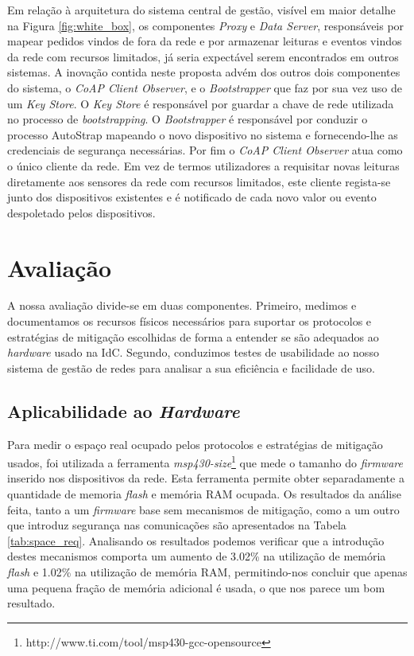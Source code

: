\documentclass{llncs}
\begin{document}
Em relação à arquitetura do sistema central de gestão, visível em maior detalhe na Figura \ref{fig:white_box}, os componentes \textit{Proxy} e \textit{Data Server}, responsáveis por mapear pedidos vindos de fora da rede e por armazenar leituras e eventos vindos da rede com recursos limitados, já seria expectável serem encontrados em outros sistemas. 
A inovação contida neste proposta advém dos outros dois componentes do sistema, o \textit{CoAP Client Observer}, e o \textit{Bootstrapper} que faz por sua vez uso de um \textit{Key Store}. 
O \textit{Key Store} é responsável por guardar a chave de rede utilizada no processo de \textit{bootstrapping}. 
O \textit{Bootstrapper} é responsável por conduzir o processo AutoStrap mapeando o novo dispositivo no sistema e fornecendo-lhe as credenciais de segurança necessárias. Por fim o \textit{CoAP Client Observer} atua como o único cliente da rede. Em vez de termos utilizadores a requisitar novas leituras diretamente aos sensores da rede com recursos limitados, este cliente regista-se junto dos dispositivos existentes e é notificado de cada novo valor ou evento despoletado pelos dispositivos. 

\section{Avaliação}
\label{sec:evaluation}
A nossa avaliação divide-se em duas componentes. Primeiro, medimos e documentamos os recursos físicos necessários para suportar os protocolos e estratégias de mitigação escolhidas de forma a entender se são adequados ao \textit{hardware} usado na \ac{IdC}. Segundo, conduzimos testes de usabilidade ao nosso sistema de gestão de redes para analisar a sua eficiência e facilidade de uso.

\subsection{Aplicabilidade ao \textit{Hardware}}
Para medir
o espaço real ocupado pelos protocolos e estratégias de mitigação usados, foi utilizada a ferramenta \textit{msp430-size}\footnote{http://www.ti.com/tool/msp430-gcc-opensource} que mede o tamanho do \textit{firmware} inserido nos dispositivos da rede. 
Esta ferramenta permite obter separadamente a quantidade de memoria \emph{flash} e memória \ac{RAM} ocupada. Os resultados da análise feita, tanto a um \textit{firmware} base sem mecanismos de mitigação, como a um outro que introduz segurança nas comunicações são apresentados na Tabela \ref{tab:space_req}.
Analisando os resultados podemos verificar que a introdução destes mecanismos comporta um aumento de 3.02\% na utilização de memória \textit{flash} e 1.02\% na utilização de memória \ac{RAM}, permitindo-nos concluir que apenas uma pequena fração de memória adicional é usada, o que nos parece um bom resultado.
\end{document}
